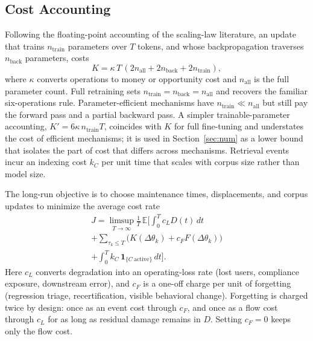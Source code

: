 \documentclass[journal]{IEEEtran}
\newcommand{\E}{\mathbb{E}}
\begin{document}
\subsection{Cost Accounting}
Following the floating-point accounting of the scaling-law literature, an update that trains $n_{\mathrm{train}}$ parameters over $T$ tokens, and whose backpropagation traverses $n_{\mathrm{back}}$ parameters, costs
\begin{equation}
K=\kappa\,T\,(2n_{\mathrm{all}}+2n_{\mathrm{back}}+2n_{\mathrm{train}}),
\end{equation}
where $\kappa$ converts operations to money or opportunity cost and $n_{\mathrm{all}}$ is the full parameter count. Full retraining sets $n_{\mathrm{train}}=n_{\mathrm{back}}=n_{\mathrm{all}}$ and recovers the familiar six-operations rule. Parameter-efficient mechanisms have $n_{\mathrm{train}}\ll n_{\mathrm{all}}$ but still pay the forward pass and a partial backward pass. A simpler trainable-parameter accounting, $K'=6\kappa\,n_{\mathrm{train}}T$, coincides with $K$ for full fine-tuning and understates the cost of efficient mechanisms; it is used in Section~\ref{sec:num} as a lower bound that isolates the part of cost that differs across mechanisms. Retrieval events incur an indexing cost $k_C$ per unit time that scales with corpus size rather than model size.

The long-run objective is to choose maintenance times, displacements, and corpus updates to minimize the average cost rate
\begin{multline}
J=\limsup_{T\to\infty}\frac{1}{T}\,\E\Big[\int_0^T c_L D(t)\,dt\\
+\sum_{\tau_k\le T}\big(K(\Delta\theta_k)+c_F F(\Delta\theta_k)\big)\\
+\int_0^T k_C\,\mathbf 1_{\{C\ \mathrm{active}\}}\,dt\Big].
\end{multline}
Here $c_L$ converts degradation into an operating-loss rate (lost users, compliance exposure, downstream error), and $c_F$ is a one-off charge per unit of forgetting (regression triage, recertification, visible behavioral change). Forgetting is charged twice by design: once as an event cost through $c_F$, and once as a flow cost through $c_L$ for as long as residual damage remains in $D$. Setting $c_F=0$ keeps only the flow cost.
\end{document}

